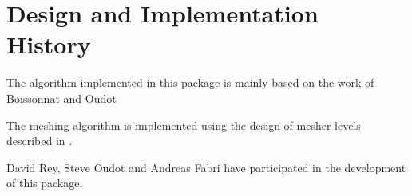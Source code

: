 \section{Design and Implementation History}

The algorithm implemented in this package
is mainly based on the  work of Boissonnat and Oudot
\cite{cgal:bo-pgsms-05}

The meshing algorithm is implemented using the design of mesher levels
described in \cite{cgal:ry-gsddrm-06}. 

David Rey, Steve Oudot and Andreas Fabri have participated
in the development of this package.





